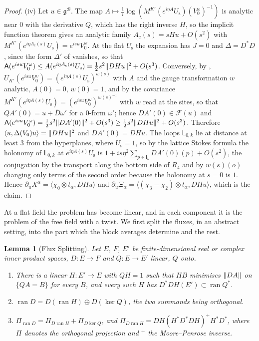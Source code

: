 \documentclass[11pt]{preprint}
\DeclarePairedDelimiter{\norm}{\lVert}{\rVert}
\numberwithin{equation}{section}
\newtheorem{lemma}[theorem]{Lemma}
\theoremstyle{definition}
\theoremstyle{remark}
\theoremstyle{plain}
\begin{document}
\begin{proof}
(iv) Let $u \in \mathfrak g^{\mathcal B}$. The map $A \mapsto \frac1i\log(M^{K'}(e^{i\eta A}U_{\mathrm s})(V_0^\omega)^{-1})$ is analytic near $0$ with the derivative $Q$, which has the right inverse $H$, so the implicit function theorem gives an analytic family $A_{\mathrm c}(s) = sHu + O(s^2)$ with $M^{K'}(e^{i\eta A_{\mathrm c}(s)}U_{\mathrm s}) = e^{isu}V_0^\omega$. At the flat $U_{\mathrm s}$ the expansion \cite[(3.12), p.~392]{BalabanPBG} has $J = 0$ and $\Delta = D^*D$, since the form $\Delta'$ of \cite[(3.10)]{BalabanPBG} vanishes, so that $\mathsf A(e^{isu}V_0^\omega) \leq A(e^{i\eta A_{\mathrm c}(s)}U_{\mathrm s}) = \frac12s^2\norm{DHu}^2 + O(s^3)$. Conversely, by \cite[Proposition~9, p.~309]{BalabanVAR}, $U_{K'}(e^{isu}V_0^\omega) = (e^{i\eta A(s)}U_{\mathrm s})^{w(s)}$ with $A$ and the gauge transformation $w$ analytic, $A(0) = 0$, $w(0) = 1$, and by the covariance $M^{K'}(e^{i\eta A(s)}U_{\mathrm s}) = (e^{isu}V_0^\omega)^{w(s)^{-1}}$ with $w$ read at the sites, so that $QA'(0) = u + \bar D\omega'$ for a $0$-form $\omega'$; hence $DA'(0) \in \mathcal F(u)$ and $\mathsf A(e^{isu}V_0^\omega) = \frac12s^2\norm{DA'(0)}^2 + O(s^3) \geq \frac12s^2\norm{DHu}^2 + O(s^3)$. Therefore $\langle u, \Delta(V_0)u\rangle = \norm{DHu}^2$ and $DA'(0) = DHu$. The loops $\mathsf L_{0,k}$ lie at distance at least $3$ from the hyperplanes, where $U_{\mathrm s} = 1$, so by the lattice Stokes formula the holonomy of $\mathsf L_{0,k}$ at $e^{i\eta A(s)}U_{\mathrm s}$ is $1 + is\eta^2\sum_{p \in \mathsf I_k}DA'(0)(p) + O(s^2)$, the conjugation by the transport along the bottom side of $R_4$ and by $w(s)(o)$ changing only terms of the second order because the holonomy at $s = 0$ is $1$. Hence $\partial_uX^\alpha = \langle\chi_0 \otimes t_\alpha, DHu\rangle$ and $\partial_u\Xi_\alpha = \langle(\chi_3 - \chi_2) \otimes t_\alpha, DHu\rangle$, which is the claim.
\end{proof}

At a flat field the problem has become linear, and in each component it is the problem of the free field with a twist. We first split the fluxes, in an abstract setting, into the part which the block averages determine and the rest.

\begin{lemma}[Flux Splitting]\label{lem:flux-splitting}
Let $E$, $F$, $E'$ be finite-dimensional real or complex inner product spaces, $D \colon E \to F$ and $Q \colon E \to E'$ linear, $Q$ onto.
\begin{enumerate}[label=(\roman*)]
\item There is a linear $H \colon E' \to E$ with $QH = 1$ such that $HB$ minimises $\norm{DA}$ on $\{ QA = B \}$ for every $B$, and every such $H$ has $D^*DH(E') \subset \operatorname{ran}Q^*$.
\item $\operatorname{ran}D = D(\operatorname{ran}H) \oplus D(\ker Q)$, the two summands being orthogonal.
\item $\Pi_{\operatorname{ran}D} = \Pi_{D\operatorname{ran}H} + \Pi_{D\ker Q}$, and $\Pi_{D\operatorname{ran}H} = DH(H^*D^*DH)^+H^*D^*$, where $\Pi$ denotes the orthogonal projection and ${}^+$ the Moore--Penrose inverse.
\end{enumerate}
\end{lemma}
\end{document}
